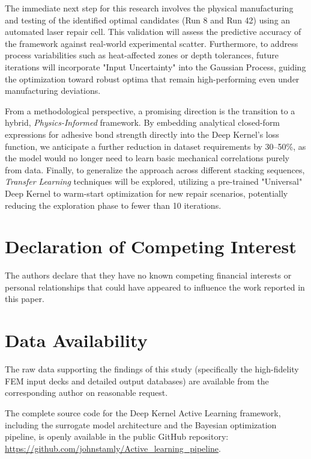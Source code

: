 \documentclass[
  preprint,
  12pt,
  a4paper
]{elsarticle}
\newcommand{\new}[1]{#1}
\begin{document}
The immediate next step for this research involves the physical manufacturing and testing of the identified optimal candidates (Run 8 and Run 42) using an automated laser repair cell. This validation will assess the predictive accuracy of the framework against real-world experimental scatter. Furthermore, to address process variabilities such as heat-affected zones or depth tolerances, future iterations will incorporate "Input Uncertainty" into the Gaussian Process, guiding the \new{optimization} toward robust optima that remain high-performing even under manufacturing deviations.

From a methodological perspective, a promising direction is the transition to a hybrid, \textit{Physics-Informed} framework. By embedding analytical closed-form expressions for adhesive bond strength \cite{psarras2024design} directly into the Deep Kernel's loss function, we anticipate a further reduction in dataset requirements by 30--50\%, as the model would no longer need to learn basic mechanical correlations purely from data. Finally, to generalize the approach across different stacking sequences, \textit{Transfer Learning} techniques will be explored, utilizing a pre-trained "Universal" Deep Kernel to warm-start optimization for new repair scenarios, potentially reducing the exploration phase to fewer than 10 iterations.





\section*{Declaration of Competing Interest}
The authors declare that they have no known competing financial interests or personal relationships that could have appeared to influence the work reported in this paper.

\section*{Data Availability}
The raw data supporting the findings of this study (specifically the high-fidelity FEM input decks and detailed output databases) are available from the corresponding author on reasonable request. 

The complete source code for the Deep Kernel Active Learning framework, including the surrogate model architecture and the Bayesian optimization pipeline, is openly available in the public GitHub repository: \url{https://github.com/johnstamly/Active_learning_pipeline}.
\end{document}
